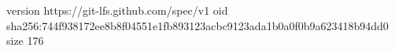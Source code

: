 version https://git-lfs.github.com/spec/v1
oid sha256:744f938172ee8b8f04551e1fb893123acbc9123ada1b0a0f0b9a623418b94dd0
size 176
